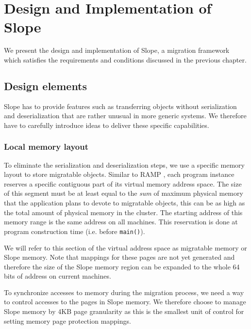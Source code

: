 \chapter{Design and Implementation of Slope}
\label{chap:design}


We present the design and implementation of Slope, a migration framework which
satisfies the requirements and conditions discussed in the previous chapter.

\section{Design elements}
Slope has to provide features such as transferring objects without serialization
and deserialization that are rather unusual in more generic systems. We
therefore have to carefully introduce ideas to deliver these specific capabilities.

\subsection{Local memory layout}
\label{sec:localmem}
To eliminate the serialization and deserialization steps, we use a specific
memory layout to store migratable objects.
Similar to RAMP \cite{memon2018ramp}, each program instance reserves a
specific contiguous part of its virtual memory address space. The size of this
segment must be at least equal to the \emph{sum} of maximum physical memory that the
application plans to devote to migratable objects, this can be
as high as the total amount of physical memory in the cluster.
The starting address of this memory range is the same address on all machines.
This reservation is done at program construction time
(i.e. before \texttt{main()}).

We will refer to this section of the virtual
address space as migratable memory or Slope memory. Note that mappings for
these pages are not yet generated and therefore the size of the Slope memory
region can be expanded to the whole 64 bits of address on current machines.

To synchronize accesses to memory during the migration process, we need a way
to control accesses to the pages in Slope memory. We therefore choose to manage
Slope memory by 4KB page granularity as this is the smallest unit of control
for setting memory page protection mappings.


